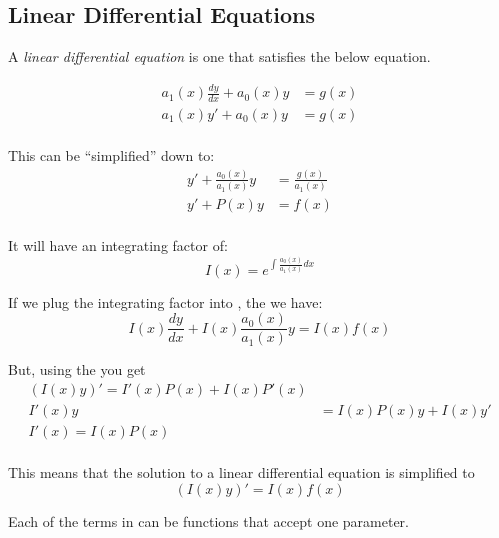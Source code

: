 \subsection{Linear Differential Equations} \label{subsec:Linear ODEs}
\begin{definition} \label{def:Linear ODE}
  A \emph{linear differential equation} is one that satisfies the below equation.

  \begin{equation} \label{eq:Linear ODE Equation}
    \begin{aligned}
      a_{1}(x) \frac{dy}{dx} + a_{0}(x)y &= g(x) \\
      a_{1}(x) y' + a_{0}(x)y &= g(x) \\
    \end{aligned}
  \end{equation}

  This can be ``simplified'' down to:
  \begin{equation*}
    \begin{aligned}
      y' + \frac{a_{0}(x)}{a_{1}(x)} y &= \frac{g(x)}{a_{1}(x)} \\
      y' + P(x) y &= f(x) \\
    \end{aligned}
  \end{equation*}

  It will have an integrating factor of:
  \begin{equation} \label{eq:Linear ODE Integrating Factor}
    I(x) = e^{\int \frac{a_{0}(x)}{a_{1}(x)} dx}
  \end{equation}

  If we plug the integrating factor into , the we have:
    \begin{equation*}
    I(x) \frac{dy}{dx} + I(x) \frac{a_{0}(x)}{a_{1}(x)} y = I(x) f(x)
  \end{equation*}

  But, using the  you get
  \begin{equation*}
    \begin{aligned}
      \left( I(x) y \right)' = I'(x)P(x) + I(x)P'(x) \\
      I'(x) y &= I(x) P(x) y + I(x) y' \\
      I'(x) = I(x) P(x) \\
    \end{aligned}
  \end{equation*}

  This means that the solution to a linear differential equation is simplified to
  \begin{equation} \label{eq:Linear ODE Solution}
    \left( I(x) y \right)' = I(x) f(x)
  \end{equation}
  
  \begin{remark}
    Each of the terms in  can be functions that accept one parameter.
  \end{remark}
\end{definition}

